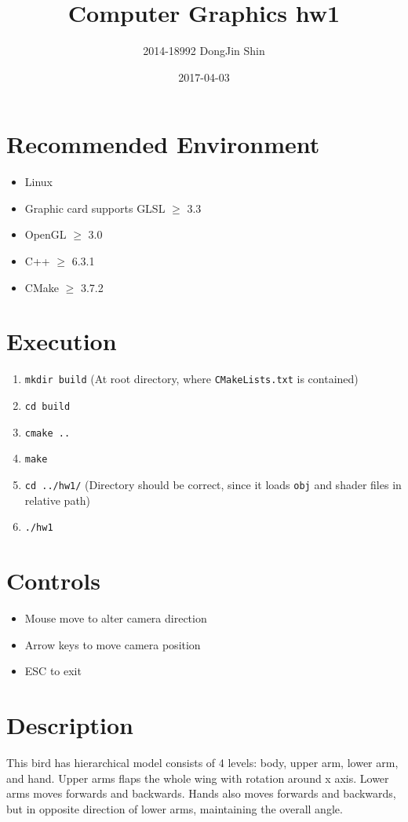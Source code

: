 \documentclass{article}
\title{Computer Graphics hw1}
\date{2017-04-03}
\author{2014-18992 DongJin Shin}
\begin{document}
	
\maketitle

\section{Recommended Environment}

\begin{itemize}
\item Linux
\item Graphic card supports GLSL $\geq$ 3.3
\item OpenGL $\geq$ 3.0
\item C++ $\geq$ 6.3.1
\item CMake $\geq$ 3.7.2
\end{itemize}

\section{Execution}

\begin{enumerate}
\item \verb|mkdir build| (At root directory, where \verb|CMakeLists.txt| is contained)
\item \verb|cd build|
\item \verb|cmake ..|
\item \verb|make|
\item \verb|cd ../hw1/| (Directory should be correct, since it loads \verb|obj| and shader files in relative path)
\item \verb|./hw1|
\end{enumerate}

\section{Controls}
\begin{itemize}
\item Mouse move to alter camera direction
\item Arrow keys to move camera position
\item ESC to exit
\end{itemize}

\section{Description}
This bird has hierarchical model consists of 4 levels: body, upper arm, lower arm, and hand.
Upper arms flaps the whole wing with rotation around x axis.
Lower arms moves forwards and backwards.
Hands also moves forwards and backwards, but in opposite direction of lower arms, maintaining the overall angle.
\end{document}
